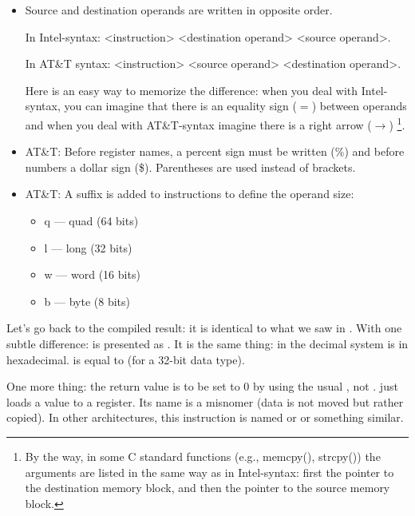 \begin{itemize}

\item
Source and destination operands are written in opposite order.

In Intel-syntax: <instruction> <destination operand> <source operand>.

In AT\&T syntax: <instruction> <source operand> <destination operand>.

Here is an easy way to memorize the difference:
when you deal with Intel-syntax, you can imagine that there is an equality sign ($=$) between operands
and when you deal with AT\&T-syntax imagine there is a right arrow ($\rightarrow$)
\footnote{By the way, in some C standard functions (e.g., memcpy(), strcpy()) the arguments
are listed in the same way as in Intel-syntax: first the pointer to the destination memory block, and then
the pointer to the source memory block.}.

\item
AT\&T: Before register names, a percent sign must be written (\%) and before numbers a dollar sign (\$).
Parentheses are used instead of brackets.

\item
AT\&T: A suffix is added to instructions to define the operand size:

\begin{itemize}
\item q --- quad (64 bits)
\item l --- long (32 bits)
\item w --- word (16 bits)
\item b --- byte (8 bits)
\end{itemize}


\end{itemize}

Let's go back to the compiled result: it is identical to what we saw in \IDA.
With one subtle difference:  is presented as .
It is the same thing:  in the decimal system is  in hexadecimal.
 is equal to  (for a 32-bit data type).

One more thing: the return value is to be set to 0 by using the usual \MOV, not \XOR.
\MOV just loads a value to a register.
Its name is a misnomer (data is not moved but rather copied). In other architectures, this instruction is named  or  or something similar.

